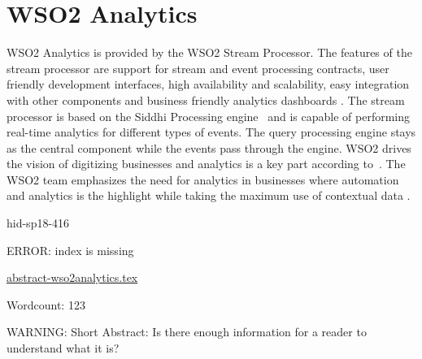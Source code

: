 \section{WSO2 Analytics}

WSO2 Analytics is provided by the WSO2 Stream Processor. The features of the 
stream processor are support for stream and event processing contracts, user 
friendly development interfaces, high availability and scalability, easy 
integration with other components and business friendly analytics dashboards 
\cite{hid-sp18-416-www-wso2-stream-processor}. The stream processor is based on 
the Siddhi Processing engine~\cite{hid-sp18-416-github-siddhi} and is capable 
of  performing real-time analytics for different types of events. The query 
processing engine stays as the central component while the events pass through 
the engine. WSO2 drives the vision of digitizing businesses and analytics is a 
key part according to~\cite{hid-sp18-416-www-srinath-conference-talk}. The WSO2 
team emphasizes the need for analytics in businesses where automation and 
analytics is the highlight while taking the maximum use of contextual data 
\cite{hid-sp18-416-www-business-benefits-analytics}.

\begin{IU}

hid-sp18-416

ERROR: index is missing

\href{https://github.com/cloudmesh-community/hid-sp18-416/blob/master//technology/abstract-wso2analytics.tex}{abstract-wso2analytics.tex}

 

Wordcount: 123

WARNING: Short Abstract: Is there enough information for a reader to understand what it is?

\end{IU}

